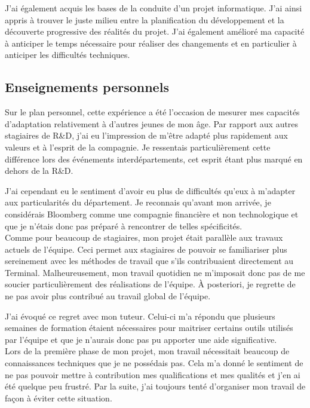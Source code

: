 \documentclass[11pt, oneside, titlepage, a4paper]{article}
\begin{document}
J'ai également acquis les bases de la conduite d'un projet informatique. J'ai ainsi appris à trouver le juste milieu entre la planification du développement et la découverte progressive des réalités du projet. J'ai également amélioré ma capacité à anticiper le temps nécessaire pour réaliser des changements et en particulier à anticiper les difficultés techniques.
	\subsection{Enseignements personnels} \label{ensperso}
Sur le plan personnel, cette expérience a été l'occasion de mesurer mes capacités d'adaptation relativement à d'autres jeunes de mon âge. Par rapport aux autres stagiaires de R\&D, j'ai eu l'impression de m'être adapté plus rapidement aux valeurs et à l'esprit de la compagnie. Je ressentais particulièrement cette différence lors des événements interdépartements, cet esprit étant plus marqué en dehors de la R\&D.

J'ai cependant eu le sentiment d'avoir eu plus de difficultés qu'eux à m'adapter aux particularités du département. Je reconnais qu'avant mon arrivée, je considérais Bloomberg comme une compagnie financière et non technologique et que je n'étais donc pas préparé à rencontrer de telles spécificités.
\\

Comme pour beaucoup de stagiaires, mon projet était parallèle aux travaux actuels de l'équipe. Ceci permet aux stagiaires de pouvoir se familiariser plus sereinement avec les méthodes de travail que s'ils contribuaient directement au Terminal. Malheureusement, mon travail quotidien ne m'imposait donc pas de me soucier particulièrement des réalisations de l'équipe. À posteriori, je regrette de ne pas avoir plus contribué au travail global de l'équipe.

J'ai évoqué ce regret avec mon tuteur. Celui-ci m'a répondu que plusieurs semaines de formation étaient nécessaires pour maitriser certains outils utilisés par l'équipe et que je n'aurais donc pas pu apporter une aide significative.
\\

Lors de la première phase de mon projet, mon travail nécessitait beaucoup de connaissances techniques que je ne possédais pas. Cela m'a donné le sentiment de ne pas pouvoir mettre à contribution mes qualifications et mes qualités et j'en ai été quelque peu frustré. Par la suite, j'ai toujours tenté d'organiser mon travail de façon à éviter cette situation.
\end{document}
